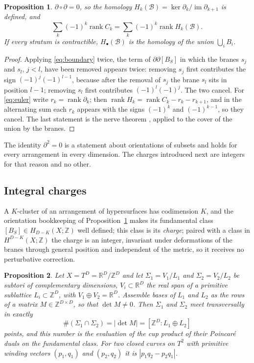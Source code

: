 \documentclass[aps,prd,10pt,twocolumn,superscriptaddress,nofootinbib,floatfix,longbibliography,showpacs,showkeys]{revtex4-2}
\theoremstyle{plain}
\newtheorem{proposition}{Proposition}
\theoremstyle{definition}
\theoremstyle{remark}
\newcommand{\bR}{\mathbb{R}}
\newcommand{\bZ}{\mathbb{Z}}
\newcommand{\cB}{\mathcal{B}}
\newcommand{\rk}{\operatorname{rank}}
\newcommand{\im}{\operatorname{im}}
\begin{document}
\begin{proposition}
\label{prop:complex}
$\partial\circ\partial=0$, so the homology $H_k(\cB)=\ker\partial_k/\im\partial_{k+1}$ is defined, and
\begin{equation}
\label{eq:euler}
\sum_{k}(-1)^k\rk C_k=\sum_k(-1)^k\rk H_k(\cB).
\end{equation}
If every stratum is contractible, $H_\bullet(\cB)$ is the homology of the union $\bigcup_iB_i$.
\end{proposition}

\begin{proof}
Applying \eqref{eq:boundary} twice, the term of $\partial\partial[B_S]$ in which the branes $s_j$ and $s_l$, $j<l$, have been removed appears twice: removing $s_j$ first contributes the sign $(-1)^j(-1)^{l-1}$, because after the removal of $s_j$ the brane $s_l$ sits in position $l-1$; removing $s_l$ first contributes $(-1)^l(-1)^j$. The two cancel. For \eqref{eq:euler} write $r_k=\rk\partial_k$; then $\rk H_k=\rk C_k-r_k-r_{k+1}$, and in the alternating sum each $r_k$ appears with the signs $(-1)^{k}$ and $(-1)^{k-1}$, so they cancel. The last statement is the nerve theorem \cite{Bauer2023}, applied to the cover of the union by the branes.
\end{proof}

The identity $\partial^2=0$ is a statement about orientations of subsets and holds for every arrangement in every dimension. The charges introduced next are integers for that reason and no other.

\subsection{Integral charges}

A $K$-cluster of an arrangement of hypersurfaces has codimension $K$, and the orientation bookkeeping of Proposition~\ref{prop:complex} makes its fundamental class $[B_S]\in H_{D-K}(X;\bZ)$ well defined; this class is its \emph{charge}; paired with a class in $H^{D-K}(X;\bZ)$ the charge is an integer, invariant under deformations of the branes through general position and independent of the metric, so it receives no perturbative correction.

\begin{proposition}
\label{prop:torus}
Let $X=T^D=\bR^D/\bZ^D$ and let $\Sigma_1=V_1/L_1$ and $\Sigma_2=V_2/L_2$ be subtori of complementary dimensions, $V_i\subset\bR^D$ the real span of a primitive sublattice $L_i\subset\bZ^D$, with $V_1\oplus V_2=\bR^D$. Assemble bases of $L_1$ and $L_2$ as the rows of a matrix $M\in\bZ^{D\times D}$, so that $\det M\ne0$. Then $\Sigma_1$ and $\Sigma_2$ meet transversally in exactly
\begin{equation}
\label{eq:detM}
\#(\Sigma_1\cap\Sigma_2)=|\det M|=[\bZ^D:L_1\oplus L_2]
\end{equation}
points, and this number is the evaluation of the cup product of their Poincar\'e duals on the fundamental class. For two closed curves on $T^2$ with primitive winding vectors $(p_1,q_1)$ and $(p_2,q_2)$ it is $|p_1q_2-p_2q_1|$.
\end{proposition}
\end{document}
